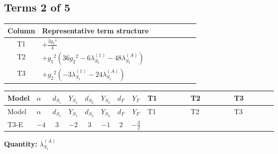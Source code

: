 \documentclass[8pt]{article}
\begin{document}
\begin{landscape}
\subsection*{Terms 2 of 5}
\begin{center}
\begin{tabular}{@{}c >{\raggedright\arraybackslash}p{0.82\linewidth}@{}}
\toprule
Column & Representative term structure \\
\midrule
T1 & \(\displaystyle +\frac{3 {g_2}^4}{4}\) \\
\midrule
T2 & \(\displaystyle +{g_1}^2 \left(36 {g_2}^2-6 {\lambda_{S_1}^{(1)}}-48 {\lambda_{S_1}^{(A)}}\right)\) \\
\midrule
T3 & \(\displaystyle +{g_2}^2 (-3 {\lambda_{S_1}^{(1)}}-24 {\lambda_{S_1}^{(A)}})\) \\
\midrule
\bottomrule
\end{tabular}
\end{center}
\smallskip
\tiny
\begin{longtable}{@{}llcccccc >{\raggedright\arraybackslash}p{0.21\linewidth} >{\raggedright\arraybackslash}p{0.21\linewidth} >{\raggedright\arraybackslash}p{0.21\linewidth}@{}}
\toprule
Model & $\alpha$ & $d_{S_1}$ & $Y_{S_1}$ & $d_{S_2}$ & $Y_{S_2}$ & $d_F$ & $Y_F$ & T1 & T2 & T3 \\
\midrule
\endfirsthead
\toprule
Model & $\alpha$ & $d_{S_1}$ & $Y_{S_1}$ & $d_{S_2}$ & $Y_{S_2}$ & $d_F$ & $Y_F$ & T1 & T2 & T3 \\
\midrule
\endhead
T3-E & $-4$ & $3$ & $-2$ & $3$ & $-1$ & $2$ & $-\frac{3}{2}$ & \scriptsize\adjustbox{max width=\linewidth}{$\begin{gathered} +\frac{3 {g_2}^4}{4}\end{gathered}$} & \scriptsize\adjustbox{max width=\linewidth}{$\begin{gathered} +{g_1}^2 \left(36 {g_2}^2-6 {\lambda_{S_1}^{(1)}}-48 {\lambda_{S_1}^{(A)}}\right)\end{gathered}$} & \scriptsize\adjustbox{max width=\linewidth}{$\begin{gathered} +{g_2}^2 (-3 {\lambda_{S_1}^{(1)}}-24 {\lambda_{S_1}^{(A)}})\end{gathered}$} \\
\midrule
\bottomrule
\end{longtable}
\clearpage
\noindent\textbf{Quantity: }$\lambda_{S_1}^{(A)}$\par\smallskip

\end{landscape}
\end{document}
